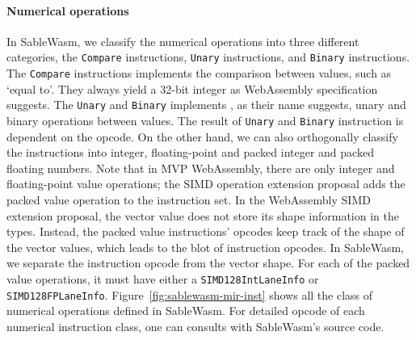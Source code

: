 \paragraph{Numerical operations}
In SableWasm, we classify the numerical operations into three different categories, the \texttt{Compare} instructions, \texttt{Unary} instructions, and \texttt{Binary} instructions. The \texttt{Compare} instructions implements the comparison between values, such as `equal to'. They always yield a 32-bit integer as WebAssembly specification suggests. The \texttt{Unary} and \texttt{Binary} implements , as their name suggests, unary and binary operations between values. The result of \texttt{Unary} and \texttt{Binary} instruction is dependent on the opcode. On the other hand, we can also orthogonally classify the instructions into integer, floating-point and packed integer and packed floating numbers. Note that in MVP WebAssembly, there are only integer and floating-point value operations; the SIMD operation extension proposal adds the packed value operation to the instruction set. In the WebAssembly SIMD extension proposal, the vector value does not store its shape information in the types. Instead, the packed value instructions' opcodes keep track of the shape of the vector values, which leads to the blot of instruction opcodes. In SableWasm, we separate the instruction opcode from the vector shape. For each of the packed value operations, it must have either a \texttt{SIMD128IntLaneInfo} or \texttt{SIMD128FPLaneInfo}. Figure~\ref{fig:sablewasm-mir-inst} shows all the class of numerical operations defined in SableWasm. For detailed opcode of each numerical instruction class, one can consults with SableWasm's source code.

